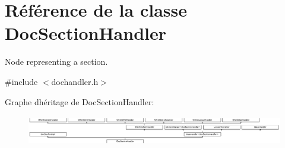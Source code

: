 \hypertarget{class_doc_section_handler}{}\section{Référence de la classe Doc\+Section\+Handler}
\label{class_doc_section_handler}


Node representing a section.  




{\ttfamily \#include $<$dochandler.\+h$>$}

Graphe d\textquotesingle{}héritage de Doc\+Section\+Handler\+:\begin{figure}[H]
\begin{center}
\leavevmode
\includegraphics[height=1.322314cm]{class_doc_section_handler}
\end{center}
\end{figure}
